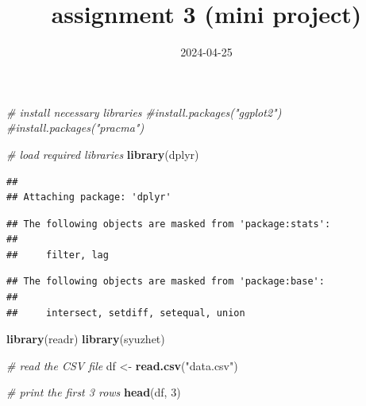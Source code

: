 \documentclass[
  a4paper,
]{article}
\title{assignment 3 (mini project)}
\author{}
\date{\vspace{-2.5em}2024-04-25}
\newenvironment{Shaded}{\begin{snugshade}}{\end{snugshade}}
\newcommand{\CommentTok}[1]{\textcolor[rgb]{0.56,0.35,0.01}{\textit{#1}}}
\newcommand{\DecValTok}[1]{\textcolor[rgb]{0.00,0.00,0.81}{#1}}
\newcommand{\FunctionTok}[1]{\textcolor[rgb]{0.13,0.29,0.53}{\textbf{#1}}}
\newcommand{\NormalTok}[1]{#1}
\newcommand{\OtherTok}[1]{\textcolor[rgb]{0.56,0.35,0.01}{#1}}
\newcommand{\StringTok}[1]{\textcolor[rgb]{0.31,0.60,0.02}{#1}}
\begin{document}
\maketitle

\begin{Shaded}
\begin{Highlighting}[]
\CommentTok{\# install necessary libraries}
\CommentTok{\#install.packages("ggplot2")}
\CommentTok{\#install.packages("pracma")}
\end{Highlighting}
\end{Shaded}

\begin{Shaded}
\begin{Highlighting}[]
\CommentTok{\# load required libraries}
\FunctionTok{library}\NormalTok{(dplyr)}
\end{Highlighting}
\end{Shaded}

\begin{verbatim}
## 
## Attaching package: 'dplyr'
\end{verbatim}

\begin{verbatim}
## The following objects are masked from 'package:stats':
## 
##     filter, lag
\end{verbatim}

\begin{verbatim}
## The following objects are masked from 'package:base':
## 
##     intersect, setdiff, setequal, union
\end{verbatim}

\begin{Shaded}
\begin{Highlighting}[]
\FunctionTok{library}\NormalTok{(readr)}
\FunctionTok{library}\NormalTok{(syuzhet)}

\CommentTok{\# read the CSV file}
\NormalTok{df }\OtherTok{\textless{}{-}} \FunctionTok{read.csv}\NormalTok{(}\StringTok{"data.csv"}\NormalTok{)}
\end{Highlighting}
\end{Shaded}

\begin{Shaded}
\begin{Highlighting}[]
\CommentTok{\# print the first 3 rows}
\FunctionTok{head}\NormalTok{(df, }\DecValTok{3}\NormalTok{)}
\end{Highlighting}
\end{Shaded}
\end{document}
